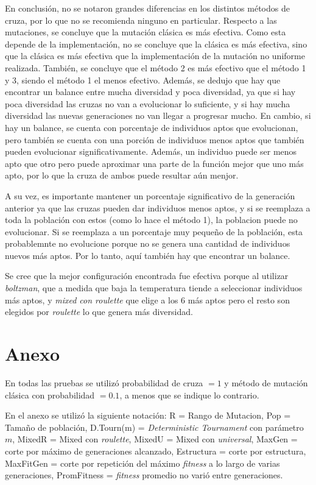 \documentclass[11pt,a4paper]{article}
\begin{document}
En conclusión, no se notaron grandes diferencias en los distintos métodos de cruza, por lo que no se recomienda ninguno en particular. Respecto a las mutaciones, se concluye que la mutación clásica es más efectiva. Como esta depende de la implementación, no se concluye que la clásica es más efectiva, sino que la clásica es más efectiva que la implementación de la mutación no uniforme realizada. También, se concluye que el método 2 es más efectivo que el método 1 y 3, siendo el método 1 el menos efectivo. Además, se dedujo que hay que encontrar un balance entre mucha diversidad y poca diversidad, ya que si hay poca diversidad las cruzas no van a evolucionar lo suficiente, y si hay mucha diversidad las nuevas generaciones no van llegar a progresar mucho. En cambio, si hay un balance, se cuenta con porcentaje de individuos aptos que evolucionan, pero también se cuenta con una porción de individuos menos aptos que también pueden evolucionar significativamente. Además, un individuo puede ser menos apto que otro pero puede aproximar una parte de la función mejor que uno más apto, por lo que la cruza de ambos puede resultar aún menjor.

A su vez, es importante mantener un porcentaje significativo de la generación anterior ya que las cruzas pueden dar individuos menos aptos, y si se reemplaza a toda la población con estos (como lo hace el método 1), la poblacion puede no evolucionar. Si se reemplaza a un porcentaje muy pequeño de la población, esta probablemnte no evolucione porque no se genera una cantidad de individuos nuevos más aptos. Por lo tanto, aquí también hay que encontrar un balance.

Se cree que la mejor configuración encontrada fue efectiva porque al utilizar \emph{boltzman}, que a medida que baja la temperatura tiende a seleccionar individuos más aptos, y \emph{mixed con roulette} que elige a los 6 más aptos pero el resto son elegidos por \emph{roulette} lo que genera más diversidad. 
   

\clearpage	
\appendix
\renewcommand{\figurename}{Figura}
\section{Anexo}

En todas las pruebas se utilizó probabilidad de cruza $=1$ y método de mutación clásica con probabilidad $= 0.1$, a menos que se indique lo contrario.

En el anexo se utilizó la siguiente notación: R = Rango de Mutacion, Pop = Tamaño de población, D.Tourn(m) = \emph{Deterministic Tournament} con parámetro $m$, MixedR = Mixed con \emph{roulette}, MixedU = Mixed con \emph{universal}, MaxGen = corte por máximo de generaciones alcanzado, Estructura = corte por estructura, MaxFitGen = corte por repetición del máximo \emph{fitness} a lo largo de varias generaciones, PromFitness = \emph{fitness} promedio no varió entre generaciones.
\end{document}
